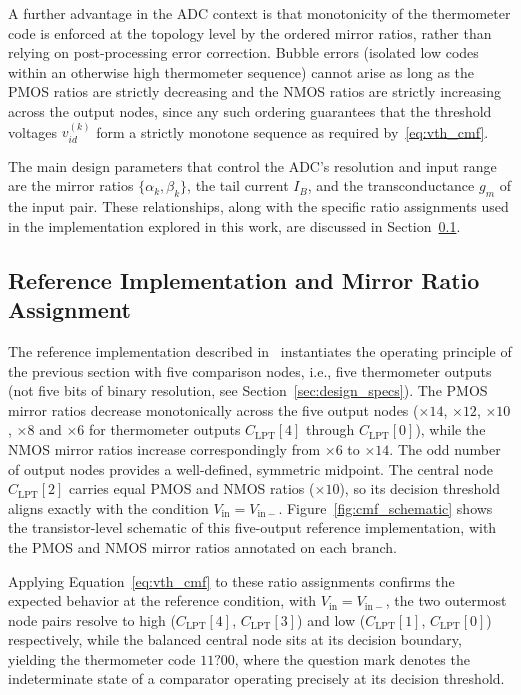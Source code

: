 A further advantage in the ADC context is that monotonicity of the thermometer code is
enforced at the topology level by the ordered mirror ratios, rather than relying on
post-processing error correction. Bubble errors (isolated low codes within an otherwise
high thermometer sequence) cannot arise as long as the PMOS ratios are strictly
decreasing and the NMOS ratios are strictly increasing across the output nodes, since any
such ordering guarantees that the threshold voltages $v_{id}^{(k)}$ form a strictly
monotone sequence as required by~\eqref{eq:vth_cmf}.

The main design parameters that control the ADC's resolution and input range are the
mirror ratios $\{\alpha_k, \beta_k\}$, the tail current $I_B$, and the transconductance
$g_m$ of the input pair. These relationships, along with the specific ratio assignments
used in the implementation explored in this work, are discussed in
Section~\ref{sec:cmf_characterisation}.
\subsection{Reference Implementation and Mirror Ratio Assignment}
\label{sec:cmf_characterisation}

The reference implementation described in~\cite{lee2017} instantiates the
operating principle of the previous section with five comparison nodes, i.e.,
five thermometer outputs (not five bits of binary resolution, see
Section~\ref{sec:design_specs}). The PMOS mirror ratios decrease monotonically
across the five output nodes ($\times 14$, $\times 12$, $\times 10$,
$\times 8$ and $\times 6$ for thermometer outputs $C_\mathrm{LPT}[4]$ through
$C_\mathrm{LPT}[0]$), while the NMOS mirror ratios increase correspondingly
from $\times 6$ to $\times 14$. The odd
number of output nodes provides a well-defined, symmetric midpoint. The
central node $C_\mathrm{LPT}[2]$ carries equal PMOS and NMOS ratios
($\times 10$), so its decision threshold aligns exactly with the condition
$V_\mathrm{in} = V_\mathrm{in-}$. Figure~\ref{fig:cmf_schematic} shows the transistor-level schematic of this five-output reference implementation, with the PMOS and NMOS mirror ratios annotated on each branch.



Applying Equation~\eqref{eq:vth_cmf} to these ratio assignments confirms the
expected behavior at the reference condition, with
$V_\mathrm{in} = V_\mathrm{in-}$, the two outermost node pairs resolve to
high ($C_\mathrm{LPT}[4]$, $C_\mathrm{LPT}[3]$) and low
($C_\mathrm{LPT}[1]$, $C_\mathrm{LPT}[0]$) respectively, while the balanced
central node sits at its decision boundary, yielding the thermometer code
$11{?}00$, where the question mark denotes the indeterminate state of a
comparator operating precisely at its decision threshold.

